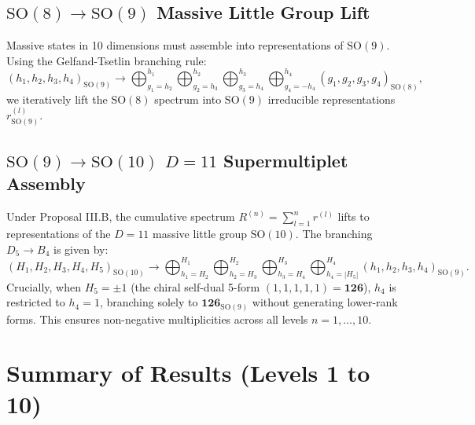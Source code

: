\documentclass[11pt,a4paper]{article}
\begin{document}
\subsection{$\mathrm{SO}(8) \to \mathrm{SO}(9)$ Massive Little Group Lift}
Massive states in 10 dimensions must assemble into representations of $\mathrm{SO}(9)$. Using the Gelfand-Tsetlin branching rule:
\begin{equation}
    (h_1, h_2, h_3, h_4)_{\mathrm{SO}(9)} \longrightarrow \bigoplus_{g_1 = h_2}^{h_1} \bigoplus_{g_2 = h_3}^{h_2} \bigoplus_{g_3 = h_4}^{h_3} \bigoplus_{g_4 = -h_4}^{h_4} (g_1, g_2, g_3, g_4)_{\mathrm{SO}(8)},
\end{equation}
we iteratively lift the $\mathrm{SO}(8)$ spectrum into $\mathrm{SO}(9)$ irreducible representations $r^{(l)}_{\mathrm{SO}(9)}$.

\subsection{$\mathrm{SO}(9) \to \mathrm{SO}(10)$ $D=11$ Supermultiplet Assembly}
Under Proposal III.B, the cumulative spectrum $R^{(n)} = \sum_{l=1}^n r^{(l)}$ lifts to representations of the $D=11$ massive little group $\mathrm{SO}(10)$. The branching $D_5 \to B_4$ is given by:
\begin{equation}
    (H_1, H_2, H_3, H_4, H_5)_{\mathrm{SO}(10)} \longrightarrow \bigoplus_{h_1 = H_2}^{H_1} \bigoplus_{h_2 = H_3}^{H_2} \bigoplus_{h_3 = H_4}^{H_3} \bigoplus_{h_4 = |H_5|}^{H_4} (h_1, h_2, h_3, h_4)_{\mathrm{SO}(9)}.
\end{equation}
Crucially, when $H_5 = \pm 1$ (the chiral self-dual 5-form $(1, 1, 1, 1, 1) = \mathbf{126}$), $h_4$ is restricted to $h_4 = 1$, branching solely to $\mathbf{126}_{\mathrm{SO}(9)}$ without generating lower-rank forms. This ensures non-negative multiplicities across all levels $n = 1, \dots, 10$.

\section{Summary of Results (Levels 1 to 10)}
\end{document}
